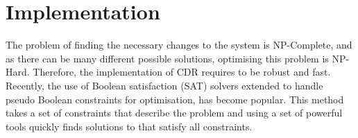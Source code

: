\chapter{Implementation}
\label{implementation}

The problem of finding the necessary changes to the system is NP-Complete, and as there can be many different possible solutions, optimising this problem is NP-Hard.
Therefore, the implementation of CDR requires to be robust and fast.
Recently, the use of Boolean satisfaction (SAT) solvers extended to handle pseudo Boolean constraints for optimisation, has become popular.
This method takes a set of constraints that describe the problem and using a set of powerful tools quickly finds solutions to that satisfy all constraints.











